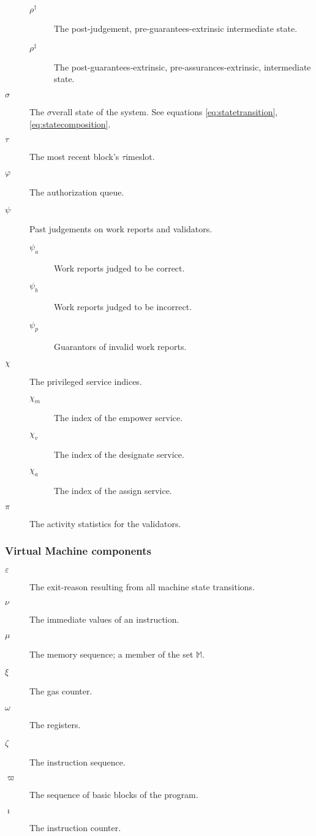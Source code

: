 \begin{description}
\begin{description}
    \item[$\rho^\dagger$] The post-judgement, pre-guarantees-extrinsic intermediate state. %
    \item[$\rho^\ddagger$] The post-guarantees-extrinsic, pre-assurances-extrinsic, intermediate state. %
  \end{description}
  \item[$\sigma$] The $\sigma$verall state of the system. See equations \ref{eq:statetransition}, \ref{eq:statecomposition}. %
  \item[$\tau$] The most recent block's $\tau$imeslot. %
  \item[$\varphi$] The authorization queue. %
  \item[$\psi$] Past judgements on work reports and validators. %
  \begin{description}
    \item[$\psi_a$] Work reports judged to be correct.
    \item[$\psi_b$] Work reports judged to be incorrect.
    \item[$\psi_p$] Guarantors of invalid work reports.
  \end{description}
  \item[$\chi$] The privileged service indices. %
  \begin{description}
    \item[$\chi_m$] The index of the empower service.
    \item[$\chi_v$] The index of the designate service.
    \item[$\chi_a$] The index of the assign service.
  \end{description}
  \item[$\pi$] The activity statistics for the validators. %
\end{description}

\subsubsection{Virtual Machine components}

\begin{description}
  \item[$\varepsilon$] The exit-reason resulting from all machine state transitions. %
  \item[$\nu$] The immediate values of an instruction. %
  \item[$\mu$] The memory sequence; a member of the set $\mathbb{M}$. %
  \item[$\xi$] The gas counter. %
  \item[$\omega$] The registers. %
  \item[$\zeta$] The instruction sequence. %
  \item[$\varpi$] The sequence of basic blocks of the program.
  \item[$\imath$] The instruction counter.
\end{description}

